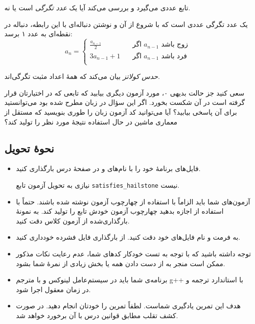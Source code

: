 \documentclass{utap}
\begin{document}
    تابع  عددی می‌گیرد و بررسی می‌کند آیا یک \textit{عدد تگرگی}\cite{su} است یا نه.

    یک عدد تگرگی عددی است که با شروع از آن و نوشتن دنباله‌ای با این رابطه، دنباله در نقطه‌ای به عدد ۱ برسد:
    \[ a_n =
      \begin{cases}
        \frac{a_{n - 1}}{2} & \quad \text{اگر $a_{n - 1}$ زوج باشد}\\
        3a_{n - 1} + 1 & \quad \text{اگر $a_{n - 1}$ فرد باشد}\\
      \end{cases}
    \]

    \textit{حدس کولاتز} بیان می‌کند که همهٔ اعداد مثبت تگرگی‌اند.

    سعی کنید جز حالت بدیهی ۰، مورد آزمون دیگری بیابید که تابعی که در اختیارتان قرار گرفته است در آن شکست بخورد.
    اگر این سؤال در زبان  مطرح شده بود می‌توانستید برای آن پاسخی بیابید؟
    آیا می‌توانید کد آزمون زبان  را طوری بنویسید که مستقل از معماری ماشین در حال استفاده نتیجهٔ مورد نظر را تولید کند؟

    \subsection{نحوهٔ تحویل}

    \begin{itemize}
    \item فایل‌های برنامهٔ خود را با نام‌های  و  در صفحهٔ  درس بارگذاری کنید.

    نیازی به تحویل آزمون تابع \lstinline{satisfies_hailstone} نیست.

    \item آزمون‌های شما باید الزاماً با استفاده از چهارچوب آزمون  نوشته شده باشند.
    حتماً با استفاده از  اجازه بدهید چهارچوب آزمون خودش تابع  را تولید کند.
    به نمونهٔ بارگذاری‌شده از آزمون کلاس  دقت کنید.
    
    \item به فرمت و نام فایل‌های خود دقت کنید. از بارگذاری فایل فشرده خودداری کنید.

    \item توجه داشته باشید که با توجه به تست خودکار کدهای شما، عدم رعایت نکات مذکور ممکن است منجر به از دست دادن همه یا بخش زیادی از نمرهٔ شما بشود.
    
    \item برنامه‌ی شما باید در سیستم‌عامل لینوکس و با مترجم g++ با استاندارد  ترجمه و در زمان معقول اجرا شود.
    
    \item هدف این تمرین یادگیری شماست. لطفاً تمرین را خودتان انجام دهید. در صورت کشف تقلب مطابق قوانین درس با آن برخورد خواهد شد.
    \end{itemize}
\end{document}
